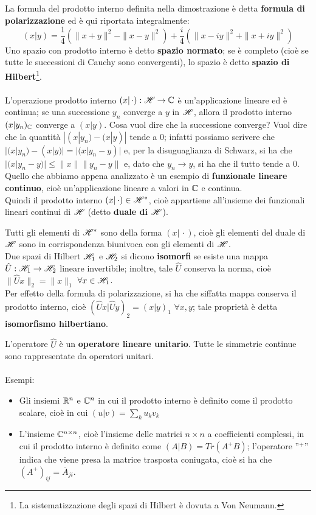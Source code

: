La formula del prodotto interno definita nella dimostrazione è detta \textbf{formula di polarizzazione} ed è qui riportata integralmente:
$$(x|y)= \frac{1}{4} (\|x+y\|^2-\|x-y\|^2)+ \frac{i}{4} (\|x-iy\|^2+\|x+iy\|^2)$$
Uno spazio con prodotto interno è detto \textbf{spazio normato}; se è completo (cioè se tutte le successioni di Cauchy sono convergenti), lo spazio è detto \textbf{spazio di Hilbert}\footnote{La sistematizzazione degli spazi di Hilbert è dovuta a Von Neumann.}.
\\
\\
L'operazione prodotto interno $(x|\, \cdot):\mathscr{H} \to \mathbb{C}$ è un'applicazione lineare ed è continua; se una successione $y_n$ converge a $y$ in $\mathscr{H}$, allora il prodotto interno $(x|y_n)_{\mathbb{C}}$ converge a $(x|y)$. Cosa vuol dire che la successione converge? Vuol dire che la quantità $|(x|y_n)-(x|y)|$ tende a $0$; infatti possiamo scrivere che $|(x|y_n)-(x|y)|=|(x|y_n-y)|$ e, per la disuguaglianza di Schwarz, si ha che $|(x|y_n-y)| \leq \|x\| \|y_n-y\|$ e, dato che $y_n \to y$, si ha che il tutto tende a $0$. \\Quello che abbiamo appena analizzato è un esempio di \textbf{funzionale lineare continuo}, cioè un'applicazione lineare a valori in $\mathbb{C}$ e continua. \\Quindi il prodotto interno $(x|\, \cdot) \in \mathscr{H}^*$, cioè appartiene all'insieme dei funzionali lineari continui di $\mathscr{H}$ (detto \textbf{duale di $\mathscr{H}$}).

Tutti gli elementi di $\mathscr{H}^*$ sono della forma $(x|\, \cdot)$, cioè gli elementi del duale di $\mathscr{H}$ sono in corrispondenza biunivoca con gli elementi di $\mathscr{H}$.
\\
Due spazi di Hilbert $\mathscr{H}_1$ e $\mathscr{H}_2$ si dicono \textbf{isomorfi} se esiste una mappa $\hat{U}:\mathscr{H}_1 \to \mathscr{H}_2$ lineare invertibile; inoltre, tale $\hat{U}$ conserva la norma, cioè $\|\hat{U} x \|_2=\|x\|_1$ $\forall x \in \mathscr{H}_1$. \\Per effetto della formula di polarizzazione, si ha che siffatta mappa conserva il prodotto interno, cioè $(\hat{U} x|\hat{U}y)_2=(x|y)_1$ $\forall x,y$; tale proprietà è detta \textbf{isomorfismo hilbertiano}.

L'operatore $\hat{U}$ è un \textbf{operatore lineare unitario}. Tutte le simmetrie continue sono rappresentate da operatori unitari.
\\
\\
Esempi:
\begin{itemize}
\item Gli insiemi $\mathbb{R}^n$ e $\mathbb{C}^n$ in cui il prodotto interno è definito come il prodotto scalare, cioè in cui $(u|v)=\sum_k u_k v_k$
\item L'insieme $\mathbb{C}^{n \times n}$, cioè l'insieme delle matrici $n \times n$ a coefficienti complessi, in cui il prodotto interno è definito come $(A|B)=Tr(A^+ B)$; l'operatore ''$^+$'' indica che viene presa la matrice trasposta coniugata, cioè si ha che $(A^+)_{ij}=\overline{A}_{ji}$.
\end{itemize}

